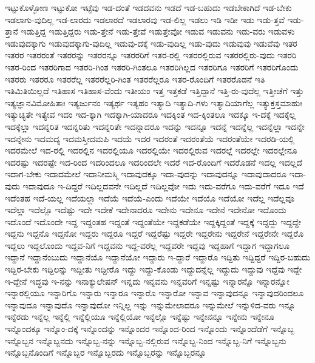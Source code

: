 {ಇಟ್ಟುಕೊಳ್ಳೋಣ
ಇಟ್ಟುಕೋ
ಇಟ್ಟೆವು
ಇಡ-ದಂತೆ
ಇಡದವನು
ಇಡದೆ
ಇಡ-ಬಹುದು
ಇಡಬೇಕಾಗಿದೆ
ಇಡ-ಬೇಕು
ಇಡಲಾಗು-ವುದಿಲ್ಲ
ಇಡ-ಲಾರದು
ಇಡಲಾರದೆ
ಇಡಲಾರವು
ಇಡ-ಲಿಲ್ಲ
ಇಡಲು
ಇಡಿ
ಇಡೀ
ಇಡು
ಇಡು-ತ್ತವೆ
ಇಡು-ತ್ತಾನೆ
ಇಡುತ್ತಿದ್ದ
ಇಡುತ್ತಿದ್ದರು
ಇಡು-ತ್ತೇನೆ
ಇಡು-ತ್ತೇವೆ
ಇಡುತ್ತೇವೋ
ಇಡುವ
ಇಡುವನು
ಇಡು-ವರು
ಇಡುವಳು
ಇಡುವುದಕ್ಕಾಗು
ಇಡುವುದಕ್ಕಾಗು-ವುದಿಲ್ಲ
ಇಡುವು-ದಕ್ಕೆ
ಇಡು-ವುದಿಲ್ಲ
ಇಡು-ವುದು
ಇಡುವುವು
ಇಡುವೆವು
ಇತರ
ಇತರರ
ಇತರರಂತೆ
ಇತರರನ್ನು
ಇತರರನ್ನೂ
ಇತರರರಿಗೆ
ಇತರ-ರಲ್ಲಿ
ಇತರರಲ್ಲಿರುವ
ಇತರರಲ್ಲಿರು-ವುದು
ಇತರರಿ
ಇತರ-ರಿಂದ
ಇತರರಿಗಾದ
ಇತರರಿ-ಗಿಂತ
ಇತರರಿ-ಗಿಂತಲೂ
ಇತರರಿಗಿಲ್ಲದ
ಇತರರಿಗೂ
ಇತರರಿಗೆ
ಇತರರಿಗೊಂದು
ಇತರರು
ಇತರರೂ
ಇತರರೆಲ್ಲ
ಇತರರೆಲ್ಲರಿ-ಗಿಂತ
ಇತರರೆಲ್ಲರೂ
ಇತರ-ರೊಂದಿಗೆ
ಇತರರೊಡನೆ
ಇತಿ
ಇತಿಮಿತಿಯಿಲ್ಲದೆ
ಇತಿಹಾಸ
ಇತಿಹಾಸ-ವೆಂದು
ಇತೀಯಂ
ಇತ್ತ
ಇತ್ತಕಡೆ
ಇತ್ತಿದ್ದಾನೆ
ಇತ್ತಿ-ರು-ವುದೆಲ್ಲ
ಇತ್ತೀಚೆಗೆ
ಇತ್ತು
ಇತ್ಯಜ್ಞಾನವಿಮೋಹಿತಾಃ
ಇತ್ಯರ್ಜುನಂ
ಇತ್ಯರ್ಥ
ಇತ್ಯಹಂ
ಇತ್ಯಾದಿ
ಇತ್ಯಾದಿ-ಗಳು
ಇತ್ಯಾದಿಯಾಗೆಲ್ಲ
ಇತ್ಯುಕ್ತಸ್ತಮಾಹುಃ
ಇತ್ಯುಚ್ಯತೇ
ಇತ್ಯೇವ
ಇದಂ
ಇದ-ಕ್ಕಾಗಿ
ಇದಕ್ಕಾಗಿ-ಯಾದರೂ
ಇದಕ್ಕಿಂತ
ಇದ-ಕ್ಕಿಂತಲೂ
ಇದಕ್ಕೂ
ಇ-ದಕ್ಕೆ
ಇದಕ್ಕೆಲ್ಲ
ಇದಕ್ಕೆಲ್ಲಾ
ಇದನ್ನರಿತ
ಇದನ್ನರಿತು
ಇದನ್ನರಿತೇ
ಇದನ್ನಾದರೂ
ಇದನ್ನು
ಇದನ್ನೂ
ಇದನ್ನೆ
ಇದನ್ನೆಲ್ಲ
ಇದನ್ನೆಲ್ಲಾ
ಇದನ್ನೇ
ಇದನ್ನೇನು
ಇದಮದ್ಯ
ಇದಮಸ್ತೀದಮಪಿ
ಇದಯೆ
ಇದರ
ಇದರಂತೆ
ಇದರಂತೆಯೆ
ಇದರಂತೆಯೇ
ಇದರಡಿ-ಯಲ್ಲಿ
ಇದರಮೇಲೆ
ಇದ-ರಲ್ಲಿ
ಇದರಲ್ಲಿನ
ಇದರಲ್ಲಿಯೂ
ಇದರಲ್ಲಿಯೇ
ಇದರಲ್ಲಿರುವ
ಇದರಲ್ಲೆ
ಇದರಲ್ಲೇ
ಇದರಲ್ಲೇನೂ
ಇದರಷ್ಟು
ಇದರಷ್ಟೇ
ಇದ-ರಿಂದ
ಇದರಿಂದಲೂ
ಇದರಿಂದಲೇ
ಇದರೆ
ಇದ-ರೊಂದಿಗೆ
ಇದರೊಡನೆ
ಇದಲ್ಲ
ಇದಲ್ಲದೆ
ಇದಾಗ-ಬೇಕು
ಇದಾದಮೇಲೆ
ಇದಾನೀಮಸ್ಮಿ
ಇದಾವುದಕ್ಕೂ
ಇದಾ-ವುದನ್ನು
ಇದಾವುದನ್ನೂ
ಇದಾವುದಾದರೂ
ಇದಾ-ವುದು
ಇದಾವುದೂ
ಇ-ದಿದ್ದರೆ
ಇದಿಲ್ಲದವನೇ
ಇದಿಲ್ಲದೆ
ಇದಿಲ್ಲವೋ
ಇದು
ಇದು-ವರೆಗೂ
ಇದು-ವರೆಗೆ
ಇದೂ
ಇದೆ
ಇದೆಂತಹ
ಇದೆ-ಯಲ್ಲ
ಇದೆಯಲ್ಲಾ
ಇದೆಯೆ
ಇದೆಯೆ-ಎಂದು
ಇದೆಯೇ
ಇದೆಯೊ
ಇದೆಯೋ
ಇದೆಲ್ಲ
ಇದೆಲ್ಲವೂ
ಇದೆಲ್ಲಾ
ಇದೆಲ್ಲೊ
ಇದೆಷ್ಟು
ಇದೇ
ಇದೇಕೆ
ಇದೇನಾದರೂ
ಇದೇನು
ಇದೇನೂ
ಇದೇನೆ
ಇದೇನೋ
ಇದೊಂದು
ಇದೊಂದೆ
ಇದೊಂದೇ
ಇದ್ದ
ಇದ್ದಂತಹ
ಇದ್ದಂತೆ
ಇದ್ದಂತೆಯೇ
ಇದ್ದಕಡೆಯೇ
ಇದ್ದಕ್ಕಿದ್ದಂತೆ
ಇದ್ದಕ್ಕೆ
ಇದ್ದದ್ದು
ಇದ್ದದ್ದೇ
ಇದ್ದನು
ಇದ್ದನೊ
ಇದ್ದನೋ
ಇದ್ದರು
ಇದ್ದರೂ
ಇದ್ದರೆ
ಇದ್ದರೆಷ್ಟು
ಇದ್ದರೇ
ಇದ್ದರೇನು
ಇದ್ದರೇನೆ
ಇದ್ದರೇನೇ
ಇದ್ದರೊ
ಇದ್ದಲು
ಇದ್ದಲೊಂದು
ಇದ್ದವ-ನಿಗೆ
ಇದ್ದವನು
ಇದ್ದ-ವರೆಲ್ಲ
ಇದ್ದವರೇ
ಇದ್ದವು
ಇದ್ದಹಾಗೆ
ಇದ್ದಾಗ
ಇದ್ದಾಗಲೂ
ಇದ್ದಾನೆ
ಇದ್ದಾನೆಂಬುದು
ಇದ್ದಾನೆಯೊ
ಇದ್ದಾನೆಯೋ
ಇದ್ದಾರು
ಇ-ದ್ದಾರೆ
ಇದ್ದಾರೊ
ಇದ್ದಿತು
ಇದ್ದಿದ್ದರೆ
ಇದ್ದಿರ-ಬಹುದು
ಇದ್ದಿರ-ಬೇಕು
ಇದ್ದಿಲನ್ನು
ಇದ್ದೀತು
ಇದ್ದೀರೊ
ಇದ್ದು
ಇದ್ದು-ಕೊಂಡು
ಇದ್ದುದನ್ನೆಲ್ಲ
ಇದ್ದುದು
ಇದ್ದುವು
ಇದ್ದೆವು
ಇದ್ದೇ
ಇ-ದ್ದೇನೆ
ಇದ್ಧವು
ಇ-ನನ್ನು
ಇನಾಕ್ಯುಲೇಷನ್
ಇನ್ನದು
ಇನ್ನವನು
ಇನ್ನವರಿಗೆ
ಇನ್ನಷ್ಟು
ಇನ್ನಾರನ್ನೊ
ಇನ್ನಾರನ್ನೋ
ಇನ್ನಾರಲ್ಲಿಯೂ
ಇನ್ನಾರಿಗೊ
ಇನ್ನಾರು
ಇನ್ನಾರೂ
ಇನ್ನಾರೊ
ಇನ್ನಾರೋ
ಇನ್ನಾವ
ಇನ್ನಾವುದನ್ನೂ
ಇನ್ನಾವುದರಿಂದಲೂ
ಇನ್ನಾವುದೂ
ಇನ್ನಾವುದೊ
ಇನ್ನಾವುದೋ
ಇನ್ನಿಲ್ಲ
ಇನ್ನು
ಇನ್ನುಮೇಲಾದರೂ
ಇನ್ನುಮೇಲೆ
ಇನ್ನುಳಿದ-ವರು
ಇನ್ನೂ
ಇನ್ನೆರಡು
ಇನ್ನೆಲ್ಲ
ಇನ್ನೆಲ್ಲಿ
ಇನ್ನೆಲ್ಲಿಯೂ
ಇನ್ನೆಲ್ಲಿಯೋ
ಇನ್ನೆಲ್ಲೊ
ಇನ್ನೆಷ್ಟು
ಇನ್ನೇನನ್ನೂ
ಇನ್ನೇನು
ಇನ್ನೇನೂ
ಇನ್ನೊಂದಕ್ಕೂ
ಇನ್ನೊಂ-ದಕ್ಕೆ
ಇನ್ನೊಂದನ್ನು
ಇನ್ನೊಂದರ
ಇನ್ನೊಂದ-ರಿಂದ
ಇನ್ನೊಂದು
ಇನ್ನೊಂದೆಡೆಗೆ
ಇನ್ನೊಬ್ಬ
ಇನ್ನೊಬ್ಬನ
ಇನ್ನೊಬ್ಬನದು
ಇನ್ನೊಬ್ಬ-ನನ್ನು
ಇನ್ನೊಬ್ಬ-ನಲ್ಲಿರುವ
ಇನ್ನೊಬ್ಬ-ನಿಂದ
ಇನ್ನೊಬ್ಬ-ನಿಗೆ
ಇನ್ನೊಬ್ಬನು
ಇನ್ನೊಬ್ಬನೊಂದಿಗೆ
ಇನ್ನೊಬ್ಬರ
ಇನ್ನೊಬ್ಬರದು
ಇನ್ನೊಬ್ಬರನ್ನು
ಇನ್ನೊಬ್ಬರನ್ನೂ
}
